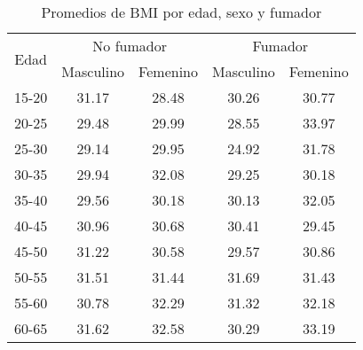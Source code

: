 \begin{table}[htb]
	\label{tab:bmi} 
	\caption{Promedios de BMI por edad, sexo y fumador} 
	\centering
	\begin{tabular}{ |c|c|c|c|c| } 
		\hline
		\multirow{2}{*}{Edad} & \multicolumn{2}{c|}{No fumador} & \multicolumn{2}{c|}{Fumador} \\ 
		\cline{2-5} 
& Masculino & Femenino & Masculino & Femenino \\ 
		\hline
		15-20 & 31.17 & 28.48 & 30.26 & 30.77 \\ 
		20-25 & 29.48 & 29.99 & 28.55 & 33.97 \\ 
		25-30 & 29.14 & 29.95 & 24.92 & 31.78 \\ 
		30-35 & 29.94 & 32.08 & 29.25 & 30.18 \\ 
		35-40 & 29.56 & 30.18 & 30.13 & 32.05 \\ 
		40-45 & 30.96 & 30.68 & 30.41 & 29.45 \\ 
		45-50 & 31.22 & 30.58 & 29.57 & 30.86 \\ 
		50-55 & 31.51 & 31.44 & 31.69 & 31.43 \\ 
		55-60 & 30.78 & 32.29 & 31.32 & 32.18 \\ 
		60-65 & 31.62 & 32.58 & 30.29 & 33.19 \\ 
		\hline 
	\end{tabular} 
\end{table} 

